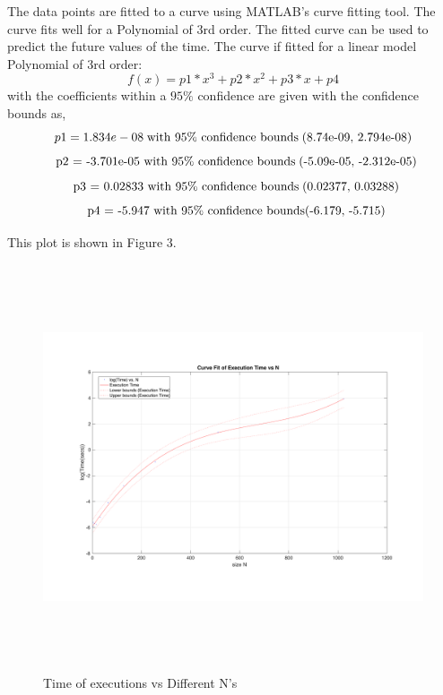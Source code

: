 \documentclass[fleqn,letterpaper,12pt]{report}
\begin{document}
The data points are fitted to a curve using MATLAB's curve fitting tool. The curve fits well for a Polynomial of 3rd order. The fitted curve can be used to predict the future values of the time.
The curve if fitted for a linear model Polynomial of 3rd order:\cite{curvefitting}
\begin{equation}
     f(x) = p1*x^3 + p2*x^2 + p3*x + p4
\label{EQ3}
\end{equation}
with the coefficients within a $95\%$ confidence are given with the confidence bounds as,
\begin{equation}
     p1 =   1.834e-08 
	 \mbox{\;with 95\% confidence bounds\;(8.74e-09, 2.794e-08)}
\label{EQ3}
\end{equation}
\begin{equation}
     \mbox{\;\;p2 =  -3.701e-05 with 95\% confidence bounds\;(-5.09e-05, -2.312e-05)} 
\label{EQ4}
\end{equation}
\begin{equation}
     \mbox{\;\;p3 =   0.02833 with 95\% confidence bounds\;(0.02377, 0.03288)}
\label{EQ5}
\end{equation}
\begin{equation}
     \mbox{\;\;p4 =   -5.947 with 95\% confidence bounds(-6.179, -5.715)}
\label{EQ6}
\end{equation}

This plot is shown in Figure 3.
\begin{figure}[ht!]
	\centering
	\includegraphics[height=120mm,width=160mm]{matrixcurve.pdf}
	\caption{Time of executions vs Different N's\label{overflow}}
\end{figure}
\end{document}
